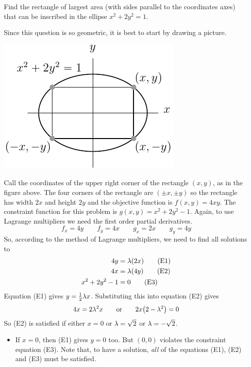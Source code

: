 \begin{eg}\label{eg LagrangeB}
Find the rectangle of largest area (with sides parallel to the coordinates
axes) that can be inscribed in the ellipse $x^2+2y^2=1$.

\soln 
Since this question is so geometric, it is best to start by drawing a 
picture. 

\begin{efig}
\begin{center}
   \includegraphics{lagrangeB}
\end{center}
\end{efig}


Call the coordinates of the upper right corner of the rectangle
$(x,y)$, as in the figure above. The four corners of the rectangle are
$(\pm x, \pm y)$ so the rectangle has width $2x$ and height $2y$ 
and the objective function is $f(x,y) = 4xy$.  The constraint function 
for this problem is $g(x,y)=x^2+2y^2-1$. Again, to use Lagrange
multipliers we need the first order partial derivatives.
\begin{equation*}
f_x=4y\qquad
f_y=4x\qquad
g_x=2x\qquad
g_y=4y
\end{equation*}
So, according to the method of Lagrange multipliers, we need to find all solutions to
\begin{align*}
4y&=\lambda (2x) \tag{E1}\\
4x&=\lambda (4y) \tag{E2}\\
x^2+2y^2-1&=0  \tag{E3}
\end{align*}
Equation (E1) gives $y=\frac{1}{2}\lambda x$.
Substituting this into equation (E2) gives
\begin{align*}
4x=2\lambda^2 x \qquad\text{or}\qquad
         2x\big(2-\lambda^2\big)=0  
\end{align*}
So (E2) is satisfied if either $x=0$ or $\lambda=\sqrt{2}$ or $\lambda=-\sqrt{2}$.
\begin{itemize}
\item If $x=0$, then (E1) gives $y=0$ too. But
$(0,0)$ violates the constraint equation (E3). Note that, to have a 
solution, \emph{all} of the equations (E1), (E2) and (E3) must be 
satisfied.


\end{itemize}
\end{eg}
